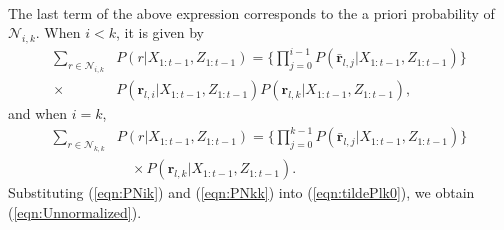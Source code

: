 \documentclass[letterpaper, 10pt, conference]{ieeeconf}
\newcommand{\refeqn}[1]{(\ref{eqn:#1})}
\begin{document}
\begin{appendix}
\begin{align}
\end{align}
The last term of the above expression corresponds to the a priori probability of $\mathcal{N}_{i,k}$. When $i<k$, it is given by
\begin{align}
\sum_{r\in\mathcal{N}_{i,k}}  &P(r|X_{1:t-1},Z_{1:t-1}) = \bigg\{\prod_{j=0}^{i-1}P(\bar{\mathbf{r}}_{l,j}|X_{1:t-1},Z_{1:t-1})\bigg\}\nonumber\\
 \times &P({\mathbf{r}}_{l,i}|X_{1:t-1},Z_{1:t-1})P({\mathbf{r}}_{l,k}|X_{1:t-1},Z_{1:t-1}),\label{eqn:PNik}
\end{align}
and when $i=k$, 
\begin{align}
\sum_{r\in\mathcal{N}_{k,k}} & P(r|X_{1:t-1},Z_{1:t-1})= \bigg\{\prod_{j=0}^{k-1}P(\bar{\mathbf{r}}_{l,j}|X_{1:t-1},Z_{1:t-1})\bigg\}\nonumber\\
&\quad \times P({\mathbf{r}}_{l,k}|X_{1:t-1},Z_{1:t-1}).\label{eqn:PNkk}
\end{align}
Substituting \refeqn{PNik} and \refeqn{PNkk} into \refeqn{tildePlk0}, we obtain \refeqn{Unnormalized}.




\end{appendix}
\end{document}
